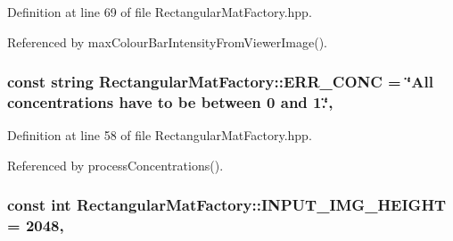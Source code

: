 Definition at line 69 of file Rectangular\-Mat\-Factory.\-hpp.



Referenced by max\-Colour\-Bar\-Intensity\-From\-Viewer\-Image().

\hypertarget{classmultiscale_1_1analysis_1_1RectangularMatFactory_a43300d891b115e25dfa33507c74cb8ab}{
\subsubsection[{E\-R\-R\-\_\-\-C\-O\-N\-C}]{\setlength{\rightskip}{0pt plus 5cm}const string Rectangular\-Mat\-Factory\-::\-E\-R\-R\-\_\-\-C\-O\-N\-C = \char`\"{}All concentrations have to be between 0 and 1.\char`\"{}\hspace{0.3cm}{\ttfamily [static]}, {\ttfamily [private]}}}\label{classmultiscale_1_1analysis_1_1RectangularMatFactory_a43300d891b115e25dfa33507c74cb8ab}


Definition at line 58 of file Rectangular\-Mat\-Factory.\-hpp.



Referenced by process\-Concentrations().

\hypertarget{classmultiscale_1_1analysis_1_1RectangularMatFactory_a5049341e062acc91027386befc8814be}{
\subsubsection[{I\-N\-P\-U\-T\-\_\-\-I\-M\-G\-\_\-\-H\-E\-I\-G\-H\-T}]{\setlength{\rightskip}{0pt plus 5cm}const int Rectangular\-Mat\-Factory\-::\-I\-N\-P\-U\-T\-\_\-\-I\-M\-G\-\_\-\-H\-E\-I\-G\-H\-T = 2048\hspace{0.3cm}{\ttfamily [static]}, {\ttfamily [private]}}}\label{classmultiscale_1_1analysis_1_1RectangularMatFactory_a5049341e062acc91027386befc8814be}


